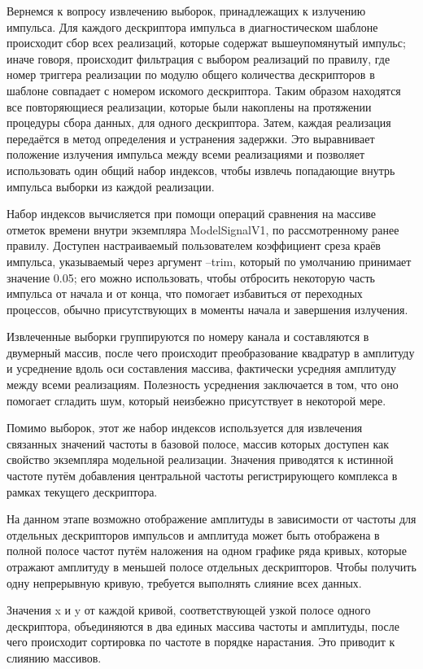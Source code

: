 \documentclass{report}
\begin{document}
Вернемся к вопросу извлечению выборок, принадлежащих к излучению импульса. Для каждого дескриптора импульса в диагностическом шаблоне происходит сбор всех реализаций, которые содержат вышеупомянутый импульс; иначе говоря, происходит фильтрация с выбором реализаций по правилу, где номер триггера реализации по модулю общего количества дескрипторов в шаблоне совпадает с номером искомого дескриптора. Таким образом находятся все повторяющиеся реализации, которые были накоплены на протяжении процедуры сбора данных, для одного дескриптора. Затем, каждая реализация передаётся в метод определения и устранения задержки. Это выравнивает положение излучения импульса между всеми реализациями и позволяет использовать один общий набор индексов, чтобы извлечь попадающие внутрь импульса выборки из каждой реализации.

Набор индексов вычисляется при помощи операций сравнения на массиве отметок времени внутри экземпляра ModelSignalV1, по рассмотренному ранее правилу. Доступен настраиваемый пользователем коэффициент среза краёв импульса, указываемый через аргумент --trim, который по умолчанию принимает значение 0.05; его можно использовать, чтобы отбросить некоторую часть импульса от начала и от конца, что помогает избавиться от переходных процессов, обычно присутствующих в моменты начала и завершения излучения.

Извлеченные выборки группируются по номеру канала и составляются в двумерный массив, после чего происходит преобразование квадратур в амплитуду и усреднение вдоль оси составления массива, фактически усредняя амплитуду между всеми реализациям. Полезность усреднения заключается в том, что оно помогает сгладить шум, который неизбежно присутствует в некоторой мере.

Помимо выборок, этот же набор индексов используется для извлечения связанных значений частоты в базовой полосе, массив которых доступен как свойство экземпляра модельной реализации. Значения приводятся к истинной частоте путём добавления центральной частоты регистрирующего комплекса в рамках текущего дескриптора.

На данном этапе возможно отображение амплитуды в зависимости от частоты для отдельных дескрипторов импульсов и амплитуда может быть отображена в полной полосе частот путём наложения на одном графике ряда кривых, которые отражают амплитуду в меньшей полосе отдельных дескрипторов. Чтобы получить одну непрерывную кривую, требуется выполнять слияние всех данных.

Значения x и y от каждой кривой, соответствующей узкой полосе одного дескриптора, объединяются в два единых массива частоты и амплитуды, после чего происходит сортировка по частоте в порядке нарастания. Это приводит к слиянию массивов.
\end{document}

